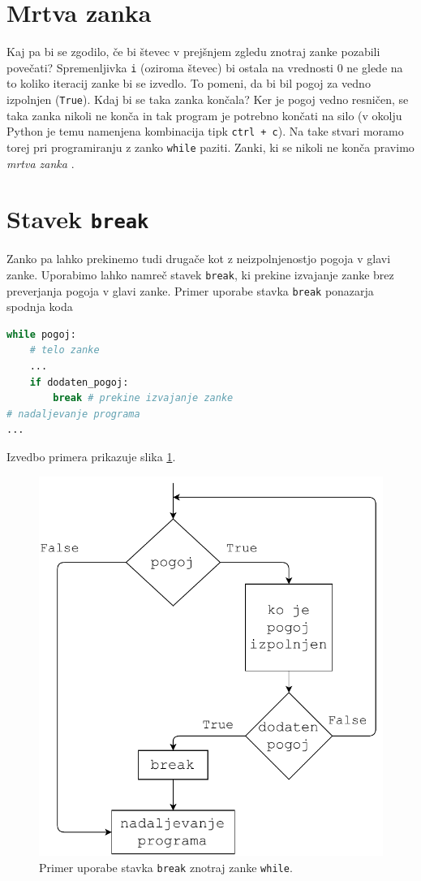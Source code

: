 \section{Mrtva zanka}

Kaj pa bi se zgodilo, če bi števec v prejšnjem zgledu znotraj zanke pozabili povečati? Spremenljivka \texttt{i} (oziroma števec) bi ostala na vrednosti 0 ne glede na to koliko iteracij zanke bi se izvedlo. To pomeni, da bi bil pogoj za vedno izpolnjen (\texttt{True}). Kdaj bi se taka zanka končala? Ker je pogoj vedno resničen, se taka zanka nikoli ne konča in tak program je potrebno končati na silo (v okolju Python je temu namenjena kombinacija tipk \texttt{ctrl + c}). Na take stvari moramo torej pri programiranju z zanko \texttt{while} paziti. Zanki, ki se nikoli ne konča pravimo \emph{mrtva zanka} .

\section{Stavek \texttt{break}}
Zanko pa lahko prekinemo tudi drugače kot z neizpolnjenostjo pogoja v glavi zanke. Uporabimo lahko namreč stavek \texttt{break}, ki prekine izvajanje zanke brez preverjanja pogoja v glavi zanke. Primer uporabe stavka \texttt{break} ponazarja spodnja koda
\begin{lstlisting}[language=Python]
while pogoj:
    # telo zanke
    ...
    if dodaten_pogoj: 
        break # prekine izvajanje zanke
# nadaljevanje programa
...
\end{lstlisting}
Izvedbo primera prikazuje slika \ref{img:while2}. 
\begin{figure}
    \centering
    \includegraphics[width=0.5\linewidth]{img/while2.pdf}
    \caption{Primer uporabe stavka \texttt{break} znotraj zanke \texttt{while}.}
    \label{img:while2}
\end{figure}

